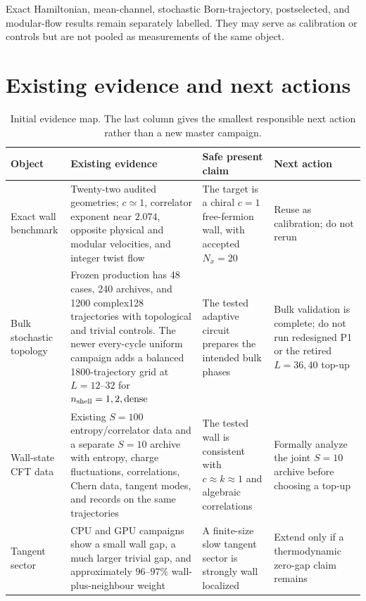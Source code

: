 \documentclass[aps,prx,twocolumn,floatfix,nofootinbib,superscriptaddress]{revtex4-2}
\begin{document}
Exact Hamiltonian, mean-channel, stochastic Born-trajectory, postselected, and
modular-flow results remain separately labelled.  They may serve as calibration
or controls but are not pooled as measurements of the same object.

\section{Existing evidence and next actions}

\begin{table}[t]
\caption{Initial evidence map.  The last column gives the smallest responsible
next action rather than a new master campaign.}
\label{tab:evidence}
\footnotesize
\renewcommand{\arraystretch}{1.15}
\begin{tabularx}{\textwidth}{@{}p{}p{}Yp{0.22\textwidth}@{}}
\toprule
Object & Existing evidence & Safe present claim & Next action \\
\midrule
Exact wall benchmark
& Twenty-two audited geometries; $c\simeq1$, correlator exponent near $2.074$,
opposite physical and modular velocities, and integer twist flow
& The target is a chiral $c=1$ free-fermion wall, with accepted $N_x=20$
& Reuse as calibration; do not rerun \\

Bulk stochastic topology
& Frozen production has 48 cases, 240 archives, and 1200 complex128
trajectories with topological and trivial controls.  The newer every-cycle
uniform campaign adds a balanced 1800-trajectory grid at $L=12$--$32$ for
$n_{\rm shell}=1,2,\mathrm{dense}$
& The tested adaptive circuit prepares the intended bulk phases
& Bulk validation is complete; do not run redesigned P1 or the retired
$L=36,40$ top-up \\

Wall-state CFT data
& Existing $S=100$ entropy/correlator data and a separate $S=10$ archive with
entropy, charge fluctuations, correlations, Chern data, tangent modes, and
records on the same trajectories
& The tested wall is consistent with $c\approx k\approx1$ and algebraic
correlations
& Formally analyze the joint $S=10$ archive before choosing a top-up \\

Tangent sector
& CPU and GPU campaigns show a small wall gap, a much larger trivial gap, and
approximately $96$--$97\%$ wall-plus-neighbour weight
& A finite-size slow tangent sector is strongly wall localized
& Extend only if a thermodynamic zero-gap claim remains \\


\end{tabularx}
\end{table}
\end{document}

